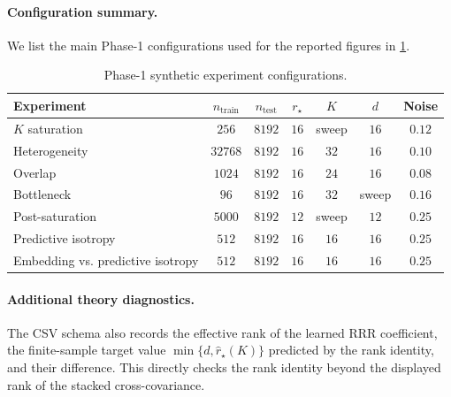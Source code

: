 \paragraph{Configuration summary.}
We list the main Phase-1 configurations used for the reported figures in
\cref{tab:appendix-configs}.

\begin{table}[t]
\centering
\caption{Phase-1 synthetic experiment configurations.}
\label{tab:appendix-configs}
\begin{tabular}{lcccccc}
\hline
Experiment & $n_{\mathrm{train}}$ & $n_{\mathrm{test}}$ & $r_\star$ & $K$ & $d$ & Noise \\
\hline
$K$ saturation & $256$ & $8192$ & $16$ & sweep & $16$ & $0.12$ \\
Heterogeneity & $32768$ & $8192$ & $16$ & $32$ & $16$ & $0.10$ \\
Overlap & $1024$ & $8192$ & $16$ & $24$ & $16$ & $0.08$ \\
Bottleneck & $96$ & $8192$ & $16$ & $32$ & sweep & $0.16$ \\
Post-saturation & $5000$ & $8192$ & $12$ & sweep & $12$ & $0.25$ \\
Predictive isotropy & $512$ & $8192$ & $16$ & $16$ & $16$ & $0.25$ \\
Embedding vs. predictive isotropy & $512$ & $8192$ & $16$ & $16$ & $16$ & $0.25$ \\
\hline
\end{tabular}
\end{table}

\paragraph{Additional theory diagnostics.}
The CSV schema also records the effective rank of the learned RRR coefficient,
the finite-sample target value $\min\{d,\widehat{r}_\star(K)\}$ predicted by
the rank identity, and their difference. This directly checks the rank identity beyond
the displayed rank of the stacked cross-covariance.

